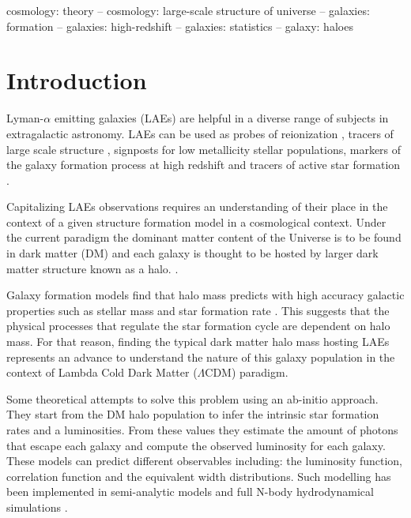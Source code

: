 \documentclass[usenatbib]{mn2e}
\newcommand{\ly}{{\ifmmode{{\rm Ly}\alpha}\else{Ly$\alpha$~}\fi}}
\begin{document}
\begin{keywords}
{cosmology: theory – cosmology: large-scale structure of universe –
  galaxies: formation – galaxies: high-redshift – galaxies: statistics
  – galaxy: haloes} 
\end{keywords}


\section{Introduction}

Lyman-$\alpha$ emitting galaxies (LAEs) are helpful in a diverse range
of subjects in extragalactic astronomy. LAEs can be
used as probes of reionization \citep{Dijkstra11}, tracers of large
scale structure \citep{Koehler2007},  signposts for low metallicity
stellar populations, markers of the galaxy formation process at high
redshift \citep{Dayal2009,ForeroRomero2012} and tracers of active star
formation \citep{Guaita2013}. 

Capitalizing LAEs observations requires an understanding of
their place in the context of a given structure formation model in a
cosmological context. Under the current paradigm the dominant matter
content of the Universe is to be found in dark matter (DM) and each
galaxy is thought to be hosted by larger dark matter structure known
as a halo. \citep{Peebles1980,SpringelNature05}. 

Galaxy formation models find that halo mass predicts with high
accuracy galactic properties such as stellar mass and star formation
rate \citep{Behroozi2013a}. This suggests that the
physical processes that regulate the star formation cycle are 
dependent on halo mass.  For that reason, finding the typical dark
matter halo mass hosting LAEs represents an advance to understand the
nature of this galaxy population in the context of Lambda Cold Dark
Matter ($\Lambda$CDM) paradigm.  

Some theoretical attempts to solve this problem using an  ab-initio
approach. They start from the DM halo population to infer the
intrinsic star formation rates and \ly a luminosities. From these
values they estimate the amount of \ly photons that
escape each galaxy and compute the observed luminosity for each
galaxy. These models can predict different observables including: the
luminosity function, correlation function and the equivalent width
distributions. Such modelling has been implemented in semi-analytic
models \citep{Garel2012,Orsi2012,Soler2012} and  full N-body
hydrodynamical simulations \citep{Laursen2007, Dayal2009,
  ForeroRomero2011, Yajima2012}. 
\end{document}
